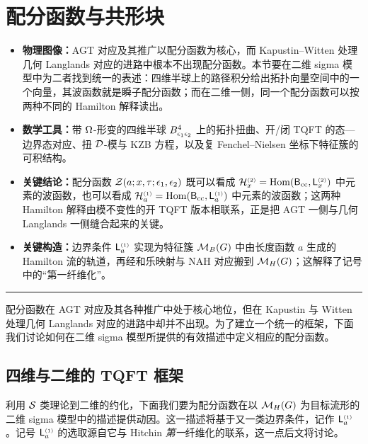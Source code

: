 \section{配分函数与共形块}\label{partfct}

\begin{keytakeaways}
\begin{itemize}
  \item \textbf{物理图像：}AGT 对应及其推广以配分函数为核心，而 Kapustin--Witten 处理几何 Langlands 对应的进路中根本不出现配分函数。本节要在二维 sigma 模型中为二者找到统一的表述：四维半球上的路径积分给出拓扑向量空间中的一个向量，其波函数就是瞬子配分函数；而在二维一侧，同一个配分函数可以按两种不同的 Hamilton 解释读出。
  \item \textbf{数学工具：}带 $\Omega$-形变的四维半球 $B^4_{\epsilon_1\epsilon_2}$ 上的拓扑扭曲、开/闭 TQFT 的态—边界态对应、扭 $\mathcal{D}$-模与 KZB 方程，以及复 Fenchel--Nielsen 坐标下特征簇的可积结构。
  \item \textbf{关键结论：}配分函数 $\mathcal{Z}(a;x,\tau;\epsilon_1,\epsilon_2)$ 既可以看成 $\mathcal{H}_x^{\scriptscriptstyle(2)}=\operatorname{Hom}(\mathsf{B}_{\rm cc},\mathsf{L}_x^{\scriptscriptstyle(2)})$ 中元素的波函数，也可以看成 $\mathcal{H}_a^{\scriptscriptstyle(1)}=\operatorname{Hom}(\mathsf{B}_{\rm cc},\mathsf{L}_a^{\scriptscriptstyle(1)})$ 中元素的波函数；这两种 Hamilton 解释由模不变性的开 TQFT 版本相联系，正是把 AGT 一侧与几何 Langlands 一侧缝合起来的关键。
  \item \textbf{关键构造：}边界条件 $\mathsf{L}^{\scriptscriptstyle(1)}_{a}$ 实现为特征簇 $\mathcal{M}_B(G)$ 中由长度函数 $a$ 生成的 Hamilton 流的轨道，再经和乐映射与 NAH 对应搬到 $\mathcal{M}_H(G)$；这解释了记号中的“第一纤维化”。
\end{itemize}
\end{keytakeaways}

\bigskip
\noindent\rule{\textwidth}{0.6pt}
\bigskip

配分函数在 AGT 对应及其各种推广中处于核心地位，但在 Kapustin 与 Witten 处理几何 Langlands 对应的进路中却并不出现。为了建立一个统一的框架，下面我们讨论如何在二维 sigma 模型所提供的有效描述中定义相应的配分函数。

\subsection{四维与二维的 TQFT 框架}

利用 $\mathcal{S}$ 类理论到二维的约化，下面我们要为配分函数在以 $\mathcal{M}_H(G)$ 为目标流形的二维 sigma 模型中的描述提供动因。这一描述将基于又一类边界条件，记作 $\mathsf{L}^{\scriptscriptstyle (1)}_{a}$。记号 $\mathsf{L}^{\scriptscriptstyle (1)}_{a}$ 的选取源自它与 Hitchin \emph{第一}纤维化的联系，这一点后文将讨论。

